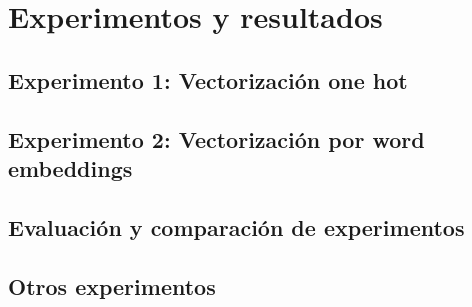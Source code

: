 \chapter{Experimentos y resultados}
\label{ch:results}

\section{Experimento 1: Vectorización one hot}

\section{Experimento 2: Vectorización por word embeddings}

\section{Evaluación y comparación de experimentos}

\section{Otros experimentos}